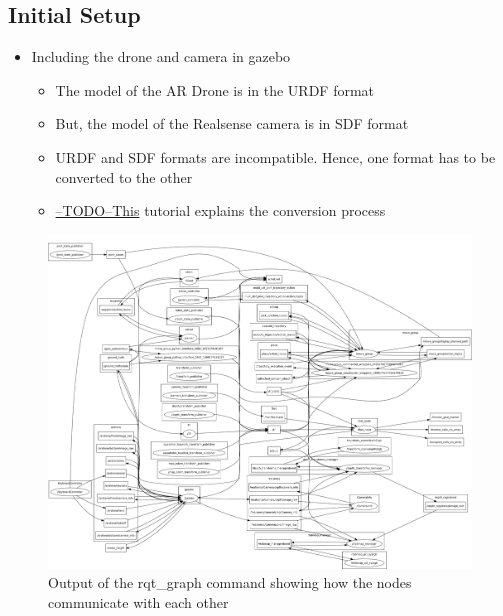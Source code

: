 \documentclass[a4paper,12pt,oneside]{book}
\begin{document}
\subsection*{Initial Setup}
\begin{itemize}
	\item Including the drone and camera in gazebo
		\begin{itemize}
			\item The model of the AR Drone is in the URDF format
			\item But, the model of the Realsense camera is in SDF format
			\item URDF and SDF formats are incompatible. Hence, one format has to be converted to the other
			\item \href{http://abc.com}{--TODO--This} tutorial explains the conversion process
		\end{itemize}
\end{itemize}

\begin{figure}[h]
	\centering
	\includegraphics[scale=0.13]{rosgraph}
	\caption{Output of the rqt\_graph command showing how the nodes communicate with each other}
\end{figure}
	
\end{document}
